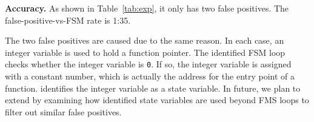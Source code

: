 \noindent\textbf{Accuracy.}
As shown in Table~\ref{tab:exp}, it only has two false positives.
The false-positive-vs-FSM rate is 1:35. 

The two false positives are caused due to the same reason. 
In each case, an integer variable is used to hold a function pointer. 
The identified FSM loop checks whether the integer variable is \texttt{0}. 
If so, the integer variable is assigned with a constant number, 
which is actually the address for the entry point of a function. 
\Tool{} identifies the integer variable as a state variable.  
In future, we plan to extend \Tool{} by examining how identified 
state variables are used beyond FMS 
loops to filter out similar false positives. 




